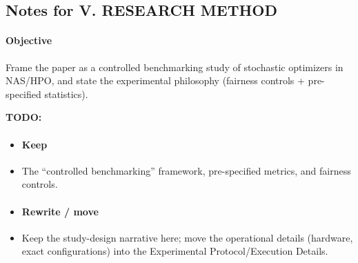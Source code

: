 \subsection*{Notes for V. RESEARCH METHOD}
\paragraph{Objective}
Frame the paper as a controlled benchmarking study of stochastic optimizers in NAS/HPO, and state the experimental philosophy (fairness controls + pre-specified statistics).

\textbf{TODO:}
\begin{itemize}
    \item \paragraph{Keep}
\end{itemize}
\begin{itemize}
  \begin{itemize}
      \item The “controlled benchmarking” framework, pre-specified metrics, and fairness controls.
  \end{itemize}
\end{itemize}

\begin{itemize}
    \item \paragraph{Rewrite / move}
\end{itemize}
\begin{itemize}
  \begin{itemize}
      \item Keep the study-design narrative here; move the operational details (hardware, exact configurations) into the Experimental Protocol/Execution Details.
  \end{itemize}
\end{itemize}


